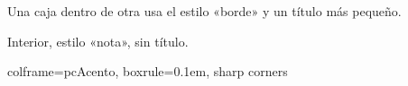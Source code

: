 \documentclass{article}
\newcommand{\cod}[1]{{\ttfamily\tam{0.8}#1}}  %
\begin{document}
\begin{fila}[columnas=4]
\begin{columna}
    \begin{caja}[titulo={Cajas dentro de cajas}]
      Una caja dentro de otra usa el estilo «borde» y un título más pequeño.
      \begin{caja}[titulo={Caja interior}]\lipsum[5][1]\end{caja}
      \begin{caja}[estilo=nota, sin titulo]Interior, estilo «nota», sin título.\end{caja}
    \end{caja}
    \begin{caja}[titulo={Cualquier opción de tcolorbox}, colframe=pcAcento, boxrule=0.1em, sharp corners]
      \cod{colframe=pcAcento, boxrule=0.1em, sharp corners}
    \end{caja}
  \end{columna}
\end{fila}
\end{document}
